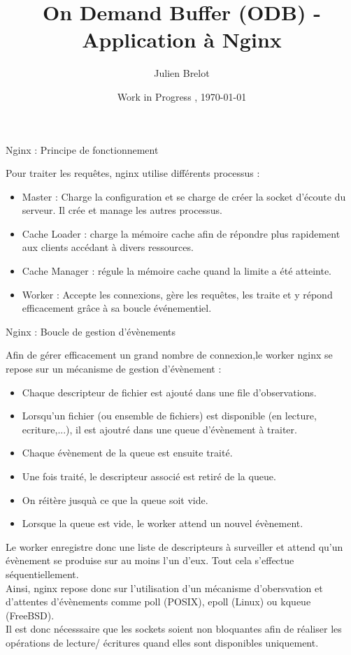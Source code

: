 \documentclass[aspectratio=43,8pt]{beamer}
\title{On Demand Buffer (ODB) - Application à Nginx}
\author[Brelot]{Julien Brelot}
\date{ Work in Progress , \today}
\begin{document}
\begin{frame}
\titlepage
\end{frame}

\begin{frame}{Nginx : Principe de fonctionnement}
\begin{card}
    Pour traiter les requêtes, nginx utilise différents processus :
    \begin{itemize}
        \item   Master : Charge la configuration et se charge de créer la socket d'écoute du serveur. Il crée et manage les autres processus.  
        \item   Cache Loader : charge la mémoire cache afin de répondre plus rapidement aux clients accédant à divers ressources.
        \item   Cache Manager : régule la mémoire cache quand la limite a été atteinte.
        \item Worker : Accepte les connexions, gère les requêtes, les traite et y répond efficacement grâce à sa boucle événementiel.
    \end{itemize}
\end{card}
\end{frame}

\begin{frame}{Nginx : Boucle de gestion d'évènements}
\begin{card}
    Afin de gérer efficacement un grand nombre de connexion,le worker nginx se repose sur un mécanisme de gestion d'évènement :
    \begin{itemize}
        \item   Chaque descripteur de fichier est ajouté dans une file d'observations.
        \item   Lorsqu'un fichier (ou ensemble de fichiers) est disponible (en lecture, ecriture,...), il est ajoutré dans une queue d'évènement à traiter.
        \item   Chaque évènement de la queue est ensuite traité.
        \item   Une fois traité, le descripteur associé est retiré de la queue.
        \item   On réitère jusquà ce que la queue soit vide.
        \item   Lorsque la queue est vide, le worker attend un nouvel évènement.
    \end{itemize}
	Le worker enregistre donc une liste de descripteurs à surveiller et attend qu'un évènement se produise sur au moins l'un d'eux.
	Tout cela s'effectue séquentiellement.\\
	Ainsi, nginx repose donc sur l'utilisation d'un mécanisme d'obersvation et d'attentes d'évènements comme poll (POSIX), epoll (Linux) ou kqueue (FreeBSD).\\
	Il est donc nécesssaire que les sockets soient non bloquantes afin de réaliser les opérations de lecture/ écritures quand elles sont disponibles uniquement.
\end{card}
\end{frame}
\end{document}
